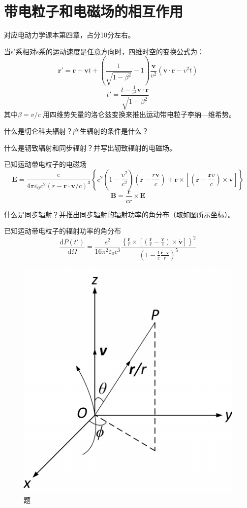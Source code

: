 \section{带电粒子和电磁场的相互作用}
对应电动力学课本第四章，占分10分左右。

\begin{question}
    当s'系相对s系的运动速度是任意方向时，四维时空的变换公式为：
    $$\mathbf{r}'=\mathbf{r}-\mathbf{v}t+(\frac{1}{\sqrt{1-\beta^2}}-1)\frac{\mathbf{v}}{v^2}(\mathbf{v}\cdot \mathbf{r}-v^2t)$$
    $$t'=\frac{t-\frac{1}{c^2}\mathbf{v}\cdot\mathbf{r}}{\sqrt{1-\beta^2}}$$
    其中$\beta=v/c$ 
 用四维势矢量的洛仑兹变换来推出运动带电粒子李纳—维希势。
\end{question}

\begin{question}
    什么是切仑科夫辐射？产生辐射的条件是什么？
\end{question}

\begin{question}
    什么是轫致辐射和同步辐射？并写出轫致辐射的电磁场。
    
    已知运动带电粒子的电磁场
    $$\mathbf{E}=\frac{e}{4\pi\varepsilon_0 c^2(r-\mathbf{r}\cdot \mathbf{v}/c)^3 }\left \{ c^2(1-\frac{v^2}{c^2})(\mathbf{r}-\frac{r\mathbf{v}}{c})+\mathbf{r} \times\left [ (\mathbf{r}-\frac{\mathbf{r}v}{c})\times \dot{\mathbf{v}} \right ] \right \}$$
    $$\mathbf{B}=\frac{\mathbf{r}}{cr}\times \mathbf{E}$$
\end{question}

\begin{question}   
    什么是同步辐射？并推出同步辐射的辐射功率的角分布（取如图所示坐标）。
    
    已知运动带电粒子的辐射功率的角分布
    $$\frac{\mathrm{d} P(t')}{\mathrm{d} \Omega}=\frac{e^2}{16\pi^2 \varepsilon_0 c^3}\frac{\left \{ \frac{\mathbf{r}}{r}\times\left [ (\frac{\mathbf{r}}{r}-\frac{\mathbf{v}}{c})\times \dot{\mathbf{v}} \right ]  \right \}^2}{(1-\frac{1}{c}\frac{\mathbf{r}\cdot \mathbf{v}}{r})^5}$$
    \begin{figure}[ht]
        \centering
        \includegraphics[height=3 cm]{images/q7_1.png}
        \caption{题\thequestion}
    \end{figure}
\end{question}


